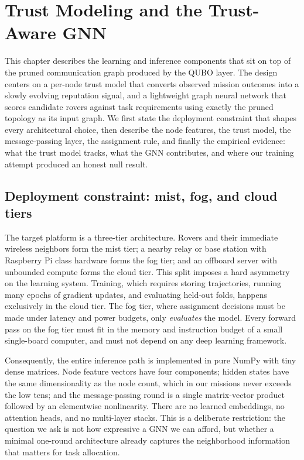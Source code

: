 \section{Trust Modeling and the Trust-Aware GNN}
\label{sec:trustgnn}

This chapter describes the learning and inference components that sit on top
of the pruned communication graph produced by the QUBO layer. The design
centers on a per-node trust model that converts observed mission outcomes
into a slowly evolving reputation signal, and a lightweight graph neural
network that scores candidate rovers against task requirements using exactly
the pruned topology as its input graph. We first state the deployment
constraint that shapes every architectural choice, then describe the node
features, the trust model, the message-passing layer, the assignment rule,
and finally the empirical evidence: what the trust model tracks, what the
GNN contributes, and where our training attempt produced an honest null
result.

\subsection{Deployment constraint: mist, fog, and cloud tiers}

The target platform is a three-tier architecture. Rovers and their immediate
wireless neighbors form the mist tier; a nearby relay or base station with
Raspberry Pi class hardware forms the fog tier; and an offboard server with
unbounded compute forms the cloud tier. This split imposes a hard asymmetry
on the learning system. Training, which requires storing trajectories,
running many epochs of gradient updates, and evaluating held-out folds,
happens exclusively in the cloud tier. The fog tier, where assignment
decisions must be made under latency and power budgets, only
\emph{evaluates} the model. Every forward pass on the fog tier must fit in
the memory and instruction budget of a small single-board computer, and must
not depend on any deep learning framework.

Consequently, the entire inference path is implemented in pure NumPy with
tiny dense matrices. Node feature vectors have four components; hidden
states have the same dimensionality as the node count, which in our missions
never exceeds the low tens; and the message-passing round is a single
matrix-vector product followed by an elementwise nonlinearity. There are no
learned embeddings, no attention heads, and no multi-layer stacks. This is a
deliberate restriction: the question we ask is not how expressive a GNN we
can afford, but whether a minimal one-round architecture already captures
the neighborhood information that matters for task allocation.

